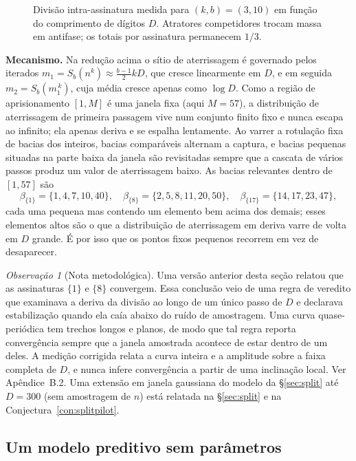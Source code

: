 \documentclass[11pt]{article}
\theoremstyle{definition}
\theoremstyle{remark}
\newtheorem{remark}[theorem]{Observação}
\begin{document}
\begin{figure}[htbp]
\centering

\caption{Divisão intra-assinatura medida para $(k,b)=(3,10)$ em função do comprimento de dígitos $D$. Atratores competidores trocam massa em antifase; os totais por assinatura permanecem $1/3$.}
\label{fig:split-osc}
\end{figure}

\textbf{Mecanismo.} Na redução acima o sítio de aterrissagem é governado pelos iterados $m_1 = S_b(n^k) \approx \tfrac{b-1}{2} k D$, que cresce linearmente em $D$, e em seguida $m_2 = S_b(m_1^{\,k})$, cuja média cresce apenas como $\log D$. Como a região de aprisionamento $[1,M]$ é uma janela fixa (aqui $M = 57$), a distribuição de aterrissagem de primeira passagem vive num conjunto finito fixo e nunca escapa ao infinito; ela apenas deriva e se espalha lentamente. Ao varrer a rotulação fixa de bacias dos inteiros, bacias comparáveis alternam a captura, e bacias pequenas situadas na parte baixa da janela são revisitadas sempre que a cascata de vários passos produz um valor de aterrissagem baixo. As bacias relevantes dentro de $[1,57]$ são
\[
\beta_{\{1\}} = \{1,4,7,10,40\}, \quad \beta_{\{8\}} = \{2,5,8,11,20,50\}, \quad \beta_{\{17\}} = \{14,17,23,47\},
\]
cada uma pequena mas contendo um elemento bem acima dos demais; esses elementos altos são o que a distribuição de aterrissagem em deriva varre de volta em $D$ grande. É por isso que os pontos fixos pequenos recorrem em vez de desaparecer.

\begin{remark}[Nota metodológica]
Uma versão anterior desta seção relatou que as assinaturas $\{1\}$ e $\{8\}$ convergem. Essa conclusão veio de uma regra de veredito que examinava a deriva da divisão ao longo de um único passo de $D$ e declarava estabilização quando ela caía abaixo do ruído de amostragem. Uma curva quase-periódica tem trechos longos e planos, de modo que tal regra reporta convergência sempre que a janela amostrada acontece de estar dentro de um deles. A medição corrigida relata a curva inteira e a amplitude sobre a faixa completa de $D$, e nunca infere convergência a partir de uma inclinação local. Ver Apêndice~B.2. Uma extensão em janela gaussiana do modelo da \S\ref{sec:split} até $D=300$ (sem amostragem de $n$) está relatada na \S\ref{sec:split} e na Conjectura~\ref{con:splitpilot}.
\end{remark}

\subsection{Um modelo preditivo sem parâmetros}
\end{document}
